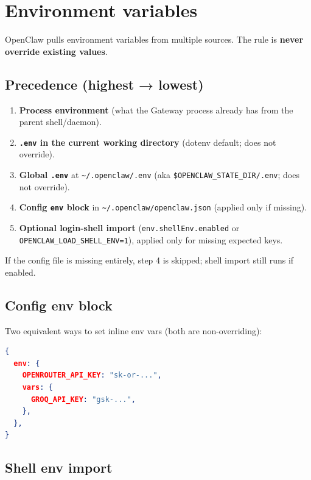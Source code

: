 \clearpage

\section{Environment variables}


OpenClaw pulls environment variables from multiple sources. The rule is \textbf{never override existing values}.

\subsection{Precedence (highest → lowest)}


\begin{enumerate}
  \item \textbf{Process environment} (what the Gateway process already has from the parent shell/daemon).
  \item \textbf{\texttt{.env} in the current working directory} (dotenv default; does not override).
  \item \textbf{Global \texttt{.env}} at \texttt{\textasciitilde{}/.openclaw/.env} (aka \texttt{\$OPENCLAW\_STATE\_DIR/.env}; does not override).
  \item \textbf{Config \texttt{env} block} in \texttt{\textasciitilde{}/.openclaw/openclaw.json} (applied only if missing).
  \item \textbf{Optional login-shell import} (\texttt{env.shellEnv.enabled} or \texttt{OPENCLAW\_LOAD\_SHELL\_ENV=1}), applied only for missing expected keys.
\end{enumerate}


If the config file is missing entirely, step 4 is skipped; shell import still runs if enabled.

\subsection{Config env block}


Two equivalent ways to set inline env vars (both are non-overriding):

\begin{lstlisting}[language=json]
{
  env: {
    OPENROUTER_API_KEY: "sk-or-...",
    vars: {
      GROQ_API_KEY: "gsk-...",
    },
  },
}
\end{lstlisting}


\subsection{Shell env import}


